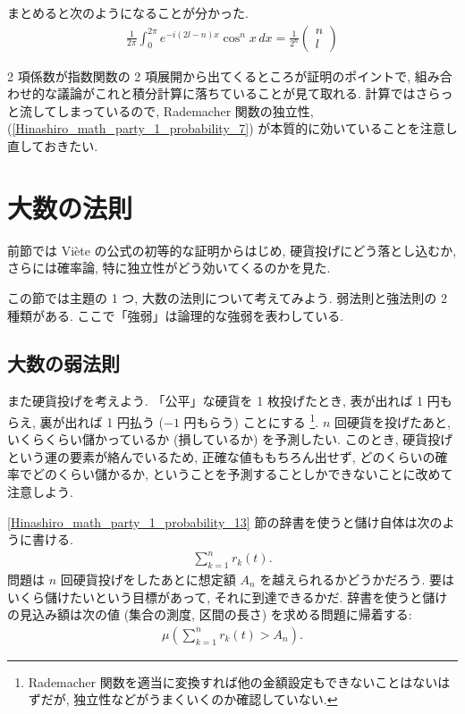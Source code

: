 \documentclass[openany, a4paper, oneside]{jsbook}
\theoremstyle{break}
\theoremstyle{breakdefn}
\newcommand{\rbk}[1]{\left (#1\right)}
\begin{document}
まとめると次のようになることが分かった.
\begin{align}
 \frac{1}{2 \pi} \int_0^{2 \pi} e^{-i (2l -n) x} \cos^n x \, dx
 =
 \frac{1}{2^n}
 \begin{pmatrix}
  n \\
  l
 \end{pmatrix} \label{Hinashiro_math_party_1_probability_9}
\end{align}

2 項係数が指数関数の 2 項展開から出てくるところが証明のポイントで,
組み合わせ的な議論がこれと積分計算に落ちていることが見て取れる.
計算ではさらっと流してしまっているので,
Rademacher 関数の独立性, (\ref{Hinashiro_math_party_1_probability_7}) が本質的に効いていることを注意し直しておきたい.
\section{大数の法則}


前節では Vi\`ete の公式の初等的な証明からはじめ, 硬貨投げにどう落とし込むか,
さらには確率論, 特に独立性がどう効いてくるのかを見た.

この節では主題の 1 つ, 大数の法則について考えてみよう.
弱法則と強法則の 2 種類がある.
ここで「強弱」は論理的な強弱を表わしている.
\subsection{大数の弱法則}


また硬貨投げを考えよう.
「公平」な硬貨を 1 枚投げたとき, 表が出れば 1 円もらえ, 裏が出れば 1 円払う ($-1$ 円もらう) ことにする \footnote{Rademacher 関数を適当に変換すれば他の金額設定もできないことはないはずだが, 独立性などがうまくいくのか確認していない.
 }.
$n$ 回硬貨を投げたあと, いくらくらい儲かっているか (損しているか) を予測したい.
このとき, 硬貨投げという運の要素が絡んでいるため, 正確な値ももちろん出せず,
どのくらいの確率でどのくらい儲かるか, ということを予測することしかできないことに改めて注意しよう.

\ref{Hinashiro_math_party_1_probability_13} 節の辞書を使うと儲け自体は次のように書ける.
\begin{align}
 \sum_{k=1}^n r_k (t).
\end{align}
問題は $n$ 回硬貨投げをしたあとに想定額 $A_n$ を越えられるかどうかだろう.
要はいくら儲けたいという目標があって, それに到達できるかだ.
辞書を使うと儲けの見込み額は次の値 (集合の測度, 区間の長さ) を求める問題に帰着する:
\begin{align}
 \mu \rbk{\sum_{k=1}^n r_k (t) > A_n}. \label{Hinashiro_math_party_1_probability_20}
\end{align}
\end{document}
